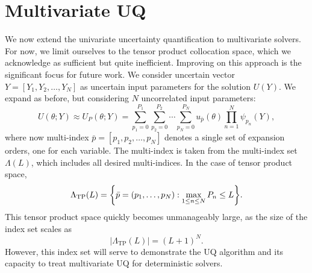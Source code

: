 \section{Multivariate UQ}
We now extend the univariate uncertainty quantification to multivariate solvers.  For now, we limit ourselves to the tensor product collocation space, which we acknowledge as sufficient but quite inefficient.  Improving on this approach is the significant focus for future work.  We consider uncertain vector $Y=[Y_1,Y_2,\ldots,Y_N]$ as uncertain input parameters for the solution $U(Y)$.  We expand as before, but considering $N$ uncorrelated input parameters:
\begin{equation}
U(\theta;Y)\approx U_P(\theta;Y) = \sum_{p_1=0}^{P_1}\sum_{p_2=0}^{P_2}\cdots\sum_{p_N=0}^{P_N} u_{\bar p}(\theta) \prod_{n=1}^N\psi_{p_n}(Y),
\end{equation}
where now multi-index $\bar p=[p_1,p_2,\ldots,p_N]$ denotes a single set of expansion orders, one for each variable.  The multi-index is taken from the multi-index set $\Lambda(L)$, which includes all desired multi-indices.  In the case of tensor product space,
\begin{equation}
\Lambda_\text{TP}(L)=\qty{\bar p=(p_1,\ldots,p_N):\max_{1\leq n\leq N} P_n\leq L}.
\end{equation}
This tensor product space quickly becomes unmanageably large, as the size of the index set scales as
\begin{equation}
|\Lambda_\text{TP}(L)|=(L+1)^N.
\end{equation}
However, this index set will serve to demonstrate the UQ algorithm and its capacity to treat multivariate UQ for deterministic solvers.

